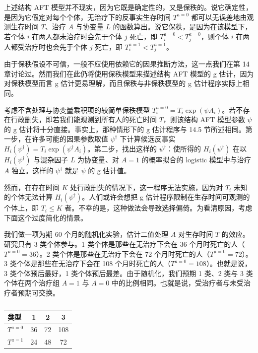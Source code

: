 上述结构 AFT 模型并不现实，因为它既是确定性的，又是保秩的。说它确定性，是因为它假定对每个个体，无治疗下的反事实生存时间 $T^{a=0}$ 都可以无误差地由观测生存时间 $T$、治疗 $A$ 与协变量 $L$ 的函数算出。说它保秩，是因为在该模型下，若个体 $i$ 在两人都未治疗时会先于个体 $j$ 死亡，即 $T_i^{a=0}<T_j^{a=0}$，则个体 $i$ 在两人都受治疗时也会先于个体 $j$ 死亡，即 $T_i^{a=1}<T_j^{a=1}$。

由于保秩假设不可信，一般不应使用依赖它的因果推断方法，这一点我们在第 14 章讨论过。然而我们在此仍将使用保秩模型来描述结构 AFT 模型的 g 估计，因为对保秩模型而言 g 估计更易理解，而且保秩与非保秩模型的 g 估计程序实际上相同。

考虑不含处理与协变量乘积项的较简单保秩模型 $T_i^{a=0}=T_i\exp(\psi A_i)$。若不存在行政删失，即若我们能观测到所有人的死亡时间 $T$，则该结构 AFT 模型参数 $\psi$ 的 g 估计将十分直接。事实上，那种情形下的 g 估计程序与 14.5 节所述相同。第一步，在许多可能的因果参数取值 $\psi^\dagger$ 下计算候选反事实 $H_i(\psi^\dagger)=T_i\exp(\psi^\dagger A_i)$。第二步，找出这样的 $\psi^\dagger$：使所得的 $H_i(\psi^\dagger)$ 在以 $H_i(\psi^\dagger)$ 与混杂因子 $L$ 为协变量、对 $A=1$ 的概率拟合的 logistic 模型中与治疗 $A$ 独立。这样的 $\psi^\dagger$ 就是 $\psi$ 的 g 估计值。

然而，在存在时间 $K$ 处行政删失的情况下，这一程序无法实施，因为对 $T_i$ 未知的个体无法计算 $H_i(\psi^\dagger)$。人们或许会想把 g 估计程序限制在生存时间可观测的个体上，即 $T_i\le K$ 者。不幸的是，这种做法会导致选择偏倚。为看清原因，考虑下面这个过度简化的情景。

我们做一项为期 60 个月的随机化实验，估计二值处理 $A$ 对生存时间 $T$ 的效应。研究只有 3 类个体参与。1 类个体是那些在无治疗下会在 36 个月时死亡的人（$T^{a=0}=36$）。2 类个体是那些在无治疗下会在 72 个月时死亡的人（$T^{a=0}=72$）。3 类个体是那些在无治疗下会在 108 个月时死亡的人（$T^{a=0}=108$）。也就是说，3 类个体预后最好，1 类个体预后最差。由于随机化，我们预期 1 类、2 类与 3 类个体在两个治疗组 $A=1$ 与 $A=0$ 中的比例相同。也就是说，受治疗者与未受治疗者预期可交换。

\begin{table}[htbp]
\centering
\caption{}
\label{tab:17.1}
\begin{tabular}{lccc}
\toprule
类型 & 1 & 2 & 3\\
\midrule
$T^{a=0}$ & 36 & 72 & 108\\
$T^{a=1}$ & 24 & 48 & 72\\
\bottomrule
\end{tabular}
\end{table}

